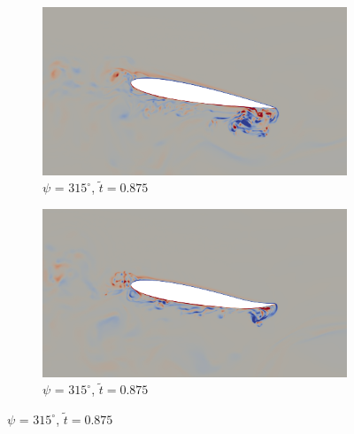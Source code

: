 \begin{figure}[H]
	\begin{subfigure}[b]{0.4\textwidth}
		\centering
		\includegraphics[width=1\textwidth]{figures/zonal_adapt_results/AC/mu_1pt5/baseline/phase_315.png}
		\caption{ $\psi$ = $315^\circ$, $\tilde{t}=0.875$}
		\label{fig:mu_1pt5_baseline_psi315}
	\end{subfigure}
	\begin{subfigure}[b]{0.4\textwidth}
		\centering
		\includegraphics[width=1\textwidth]{figures/zonal_adapt_results/AC/mu_1pt5/AC/phase_315.png}
		\caption{ $\psi$ = $315^\circ$, $\tilde{t}=0.875$}
		\label{fig:mu_1pt5_AC_psi315}
	\end{subfigure}
	

\end{figure}
